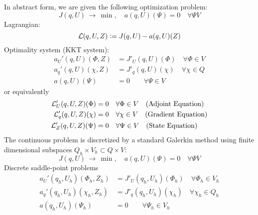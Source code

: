 {
In abstract form, we are given the following optimization problem:
\begin{equation*}
J(q,U) \, \rightarrow \, \min , \quad a(q,U)(\Psi) = 0 \quad \forall\Psi V
\end{equation*}
Lagrangian:
\begin{equation*}
{\cal L}(q,U,Z):=J(q,U) - a(q,U)(Z)
\end{equation*}
Optimality system (KKT system):
\begin{align*}
a_U'(q,U)(\Phi , Z) &= J'_U(q,U)(\Phi) \quad \forall \Phi\in V \\
a_q'(q,U)(\chi , Z) &= J'_q(q,U)(\chi) \quad \forall \chi\in Q \\
a(q,U)(\Psi) &= 0 \qquad \forall\Psi\in V
\end{align*}
or equivalently
\begin{align*}
{\cal L}'_U(q,U,Z)(\Phi) &= 0 \quad\forall \Phi\in V \quad\text{(Adjoint Equation)} \\
{\cal L}'_q(q,U,Z)(\chi) &= 0 \quad\forall \chi\in V \quad\text{(Gradient Equation)} \\
{\cal L}'_Z(q,U,Z)(\Psi) &= 0 \quad\forall \Psi\in V \quad\text{(State Equation)}
\end{align*}
The continuous problem is discretized by a standard Galerkin method using 
finite dimensional subspaces $Q_h \times V_h \subset Q\times V$:
\begin{equation*}
J(q,U) \, \rightarrow \, \min , \quad a(q,U)(\Psi) = 0 \quad \forall\Psi V
\end{equation*}
Discrete saddle-point problems
\begin{align*}
a_U'(q_h,U_h)(\Phi_h , Z_h) &= J'_U(q_h,U_h)(\Phi_h) \quad \forall \Phi_h\in V_h \\
a_q'(q_h,U_h)(\chi_h , Z_h) &= J'_q(q_h,U_h)(\chi_h) \quad \forall \chi_h\in Q_h \\
a(q_h,U_h)(\Psi_h) &= 0 \qquad \forall\Psi_h\in V_h
\end{align*}
}
